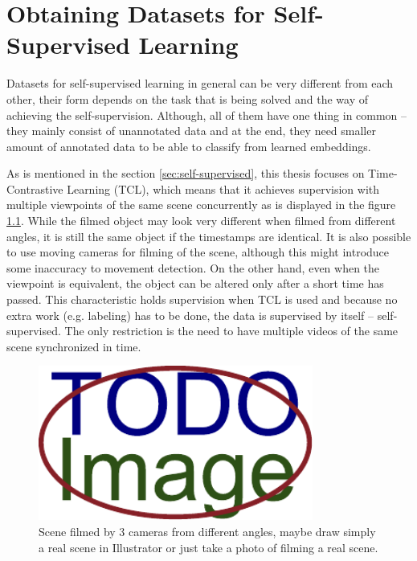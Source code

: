 \chapter{\label{chap:dataset}Obtaining Datasets for Self-Supervised Learning}

Datasets for self-supervised learning in general can be very different from each other, their form depends on the task that is being solved and the way of achieving the self-supervision. Although, all of them have one thing in common -- they mainly consist of unannotated data and at the end, they need smaller amount of annotated data to be able to classify from learned embeddings.

As is mentioned in the section \ref{sec:self-supervised}, this thesis focuses on Time-Contrastive Learning (TCL), which means that it achieves supervision with multiple viewpoints of the same scene concurrently as is displayed in the figure \ref{fig:scene-multiple-cameras}. While the filmed object may look very different when filmed from different angles, it is still the same object if the timestamps are identical. It is also possible to use moving cameras for filming of the scene, although this might introduce some inaccuracy to movement detection. On the other hand, even when the viewpoint is equivalent, the object can be altered only after a short time has passed. This characteristic holds supervision when TCL is used and because no extra work (e.g. labeling) has to be done, the data is supervised by itself -- self-supervised. The only restriction is the need to have multiple videos of the same scene synchronized in time.

\begin{figure}[ht]
    \centering
    \includegraphics[width=\linewidth,height=2in]{figures/placeholder.pdf}
    \caption{Scene filmed by 3 cameras from different angles, maybe draw simply a real scene in Illustrator or just take a photo of filming a real scene.}
    \label{fig:scene-multiple-cameras}
\end{figure}

